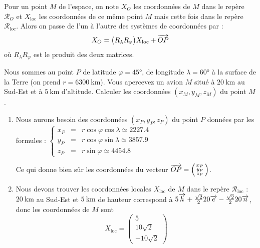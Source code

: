 \documentclass[class=report,crop=false]{standalone}
\begin{document}
Pour un point $M$ de l'espace, on note
$X_O$ les coordonnées de $M$ dans le repère $\mathcal{R}_O$
et $X_{\text{loc}}$ les coordonnées de ce même point $M$ 
mais cette fois dans le repère $\mathcal{R}_{\text{loc}}$.
Alors on passe de l'un à l'autre des systèmes de coordonnées par :
$$X_O =  \big(R_\lambda R_\varphi\big) X_{\text{loc}} + \overrightarrow{OP}$$
où $R_\lambda R_\varphi$ est le produit des deux matrices.

\begin{exemple}
Nous sommes au point $P$ de latitude $\varphi = \ang{45}$, de longitude 
$\lambda = \ang{60}$ à la surface de la Terre (on prend $r= \SI{6300}{\kilo\meter}$).
Vous apercevez un avion $M$ situé à $\SI{20}{\kilo\meter}$ au Sud-Est et à 
$\SI{5}{\kilo\meter}$ d'altitude. Calculer les coordonnées $(x_M,y_M,z_M)$ du point $M$.

\begin{enumerate}
  \item Nous aurons besoin des coordonnées $(x_P,y_P,z_P)$ du point $P$ données
par les formules :
$\left\{\begin{array}{rcl}
x_P & = & r \cos \varphi \cos \lambda \simeq \num{2227.4}\\
y_P & = & r \cos \varphi \sin \lambda \simeq \num{3857.9}\\
z_P & = & r \sin \varphi \simeq \num{4454.8}
\end{array}\right.$

Ce qui donne bien sûr les coordonnées du vecteur 
$\overrightarrow{OP}=\left(\begin{smallmatrix}x_P\\y_P\\z_P\end{smallmatrix}\right)$.
  
  \item Nous devons trouver les coordonnées locales $X_{\text{loc}}$ de $M$ dans le repère
  $\mathcal{R}_{\text{loc}}$ : $\SI{20}{\kilo\meter}$ au Sud-Est et $\SI{5}{\kilo\meter}$ de hauteur
  correspond à $5 \overrightarrow{h} + \frac{\sqrt{2}}{2} 20 \overrightarrow{e}-\frac{\sqrt{2}}{2} 20 \overrightarrow{n}$, donc les coordonnées de $M$ sont 
  $$X_{\text{loc}} = \begin{pmatrix} 5\\10\sqrt{2}\\-10\sqrt{2}\end{pmatrix}$$
  

\end{enumerate}
\end{exemple}
\end{document}

